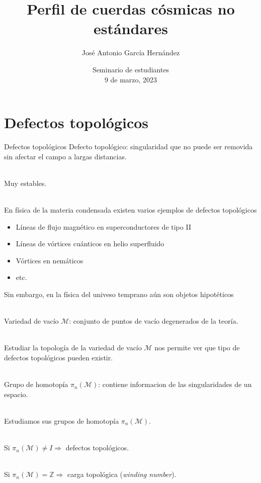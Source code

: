 \documentclass[14pt]{beamer}
\institute{Instituto de Ciencias Nucleares, UNAM}
\author{José Antonio García Hernández}
\title{Perfil de cuerdas cósmicas no estándares}
\date{{\large Seminario de estudiantes} \\ 9 de marzo, 2023}
\begin{document}
\begin{frame}
\titlepage
\end{frame}

\section{Defectos topológicos}
\begin{frame}{Defectos topológicos}
Defecto topológico: singularidad que no puede ser removida sin afectar el campo a largas distancias. \\~\

Muy estables.\\~\

\end{frame}

\begin{frame}
En física de la materia condensada existen varios ejemplos de defectos topológicos

\begin{itemize}
\item Líneas de flujo magnético en superconductores de tipo II
\item Líneas de vórtices cuánticos en helio superfluido
\item Vórtices en nemáticos
\item etc.
\end{itemize}

\end{frame}

\begin{frame}
Sin embargo, en la física del univeso temprano aún son objetos hipotéticos\\~\


Variedad de vacío $\mathcal{M}$: conjunto de puntos de vacío degenerados de la teoría.\\~\

Estudiar la topología de la variedad de vacío $\mathcal{M}$ nos permite ver que tipo de defectos topológicos pueden existir.\\~\



\end{frame}


\begin{frame}
Grupo de homotopía $\pi_n(\mathcal{M})$: contiene informacion de las singularidades de un espacio.\\~\

Estudiamos sus grupos de homotopía $\pi_n(\mathcal{M})$.\\~\

Si $\pi_n(\mathcal{M}) \neq I \Rightarrow $ defectos topológicos. \\~\

Si $\pi_n(\mathcal{M}) = \mathbb{Z} \Rightarrow $ carga topológica (\textit{winding number}).
\end{frame}
\end{document}

